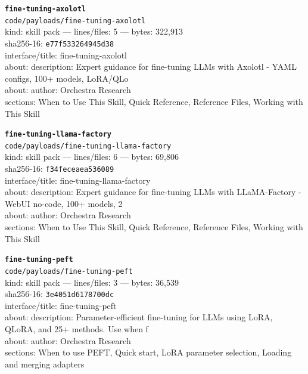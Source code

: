 \noindent\textbf{\texttt{fine-tuning-axolotl}}\\
\texttt{code/payloads/fine-tuning-axolotl}\\
kind: skill pack --- lines/files: 5 --- bytes: 322,913\\
sha256-16: \texttt{e77f533264945d38}\\
interface/title: fine-tuning-axolotl\\
about: description: Expert guidance for fine-tuning LLMs with Axolotl - YAML configs, 100+ models, LoRA/QLo\\
about: author: Orchestra Research\\
sections: When to Use This Skill, Quick Reference, Reference Files, Working with This Skill\\
\vspace*{6.0pt}

\noindent\textbf{\texttt{fine-tuning-llama-factory}}\\
\texttt{code/payloads/fine-tuning-llama-factory}\\
kind: skill pack --- lines/files: 6 --- bytes: 69,806\\
sha256-16: \texttt{f34feceaea536089}\\
interface/title: fine-tuning-llama-factory\\
about: description: Expert guidance for fine-tuning LLMs with LLaMA-Factory - WebUI no-code, 100+ models, 2\\
about: author: Orchestra Research\\
sections: When to Use This Skill, Quick Reference, Reference Files, Working with This Skill\\
\vspace*{6.0pt}

\noindent\textbf{\texttt{fine-tuning-peft}}\\
\texttt{code/payloads/fine-tuning-peft}\\
kind: skill pack --- lines/files: 3 --- bytes: 36,539\\
sha256-16: \texttt{3e4051d6178700dc}\\
interface/title: fine-tuning-peft\\
about: description: Parameter-efficient fine-tuning for LLMs using LoRA, QLoRA, and 25+ methods. Use when f\\
about: author: Orchestra Research\\
sections: When to use PEFT, Quick start, LoRA parameter selection, Loading and merging adapters\\
\vspace*{6.0pt}

